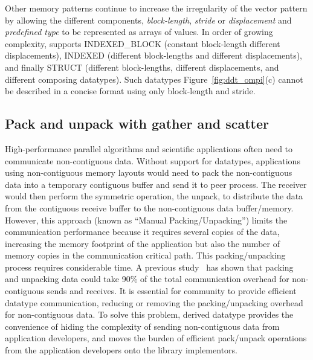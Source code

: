 \documentclass[conference]{IEEEtran}
\begin{document}
%
Other memory patterns continue to increase the irregularity of the vector
pattern by allowing the different components, \emph{block-length}, \emph{stride}
or \emph{displacement} and \emph{predefined type} to be represented as arrays of
values.
%
In order of growing complexity, \mpi supports INDEXED\_BLOCK (constant
block-length different displacements), INDEXED (different block-lengths and
different displacements), and finally STRUCT (different block-lengths, different
displacements, and different composing datatypes). Such datatypes
Figure~\ref{fig:ddt_ompi}(c) cannot be described in a concise format using only
block-length and stride.

\subsection{Pack and unpack with gather and scatter}

High-performance parallel algorithms and scientific applications often need to
communicate non-contiguous data. Without support for datatypes, applications
using non-contiguous memory layouts would need to pack the non-contiguous data
into a temporary contiguous buffer and send it to peer process. The receiver
would then perform the symmetric operation, the unpack, to distribute the data
from the contiguous receive buffer to the non-contiguous data buffer/memory.
However, this approach (known as ``Manual Packing/Unpacking”) limits the
communication performance because it requires several copies of the data,
increasing the memory footprint of the application but also the number of memory
copies in the communication critical path.
This packing/unpacking process requires considerable time. A previous
study~\cite{mpi-ddt-benchmark} has shown that packing and unpacking data could
take 90\% of the total communication overhead for non-contiguous sends and
receives. It is essential for \mpi community to provide efficient \mpi datatype
communication, reducing or removing the packing/unpacking overhead for
non-contiguous data. To solve this problem, \mpi derived datatype provides the
convenience of hiding the complexity of sending non-contiguous data from
application developers, and moves the burden of efficient pack/unpack operations
from the application developers onto the \mpi library implementors.
\end{document}
